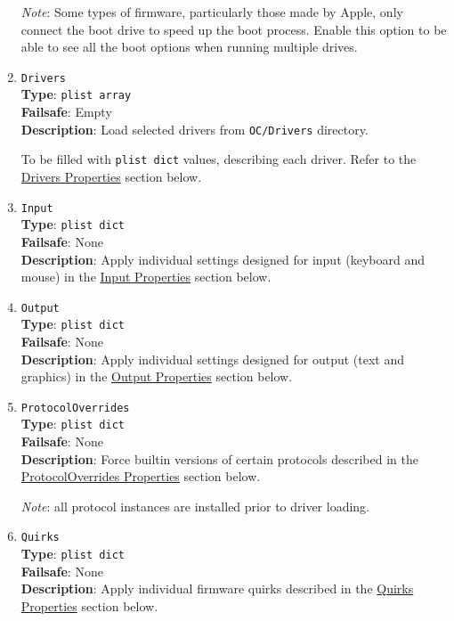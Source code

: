 \documentclass[]{article}
\begin{document}
\begin{enumerate}
  \emph{Note}: Some types of firmware, particularly those made by Apple, only connect the boot
  drive to speed up the boot process. Enable this option to be able to see all the
  boot options when running multiple drives.

\item
  \texttt{Drivers}\\
  \textbf{Type}: \texttt{plist\ array}\\
  \textbf{Failsafe}: Empty\\
  \textbf{Description}: Load selected drivers from \texttt{OC/Drivers} directory.

  To be filled with \texttt{plist\ dict} values, describing each driver.
  Refer to the \hyperref[uefidriversprops]{Drivers Properties} section below.

\item
  \texttt{Input}\\
  \textbf{Type}: \texttt{plist\ dict}\\
  \textbf{Failsafe}: None\\
  \textbf{Description}: Apply individual settings designed for input (keyboard and mouse) in the
  \hyperref[uefiinputprops]{Input Properties} section below.

\item
  \texttt{Output}\\
  \textbf{Type}: \texttt{plist\ dict}\\
  \textbf{Failsafe}: None\\
  \textbf{Description}: Apply individual settings designed for output (text and graphics) in the
  \hyperref[uefioutputprops]{Output Properties} section below.

\item
  \texttt{ProtocolOverrides}\\
  \textbf{Type}: \texttt{plist\ dict}\\
  \textbf{Failsafe}: None\\
  \textbf{Description}: Force builtin versions of certain protocols described
  in the \hyperref[uefiprotoprops]{ProtocolOverrides Properties} section below.

  \emph{Note}: all protocol instances are installed prior to driver loading.

\item
  \texttt{Quirks}\\
  \textbf{Type}: \texttt{plist\ dict}\\
  \textbf{Failsafe}: None\\
  \textbf{Description}: Apply individual firmware quirks described in the
  \hyperref[uefiquirkprops]{Quirks Properties} section below.


\end{enumerate}
\end{document}
